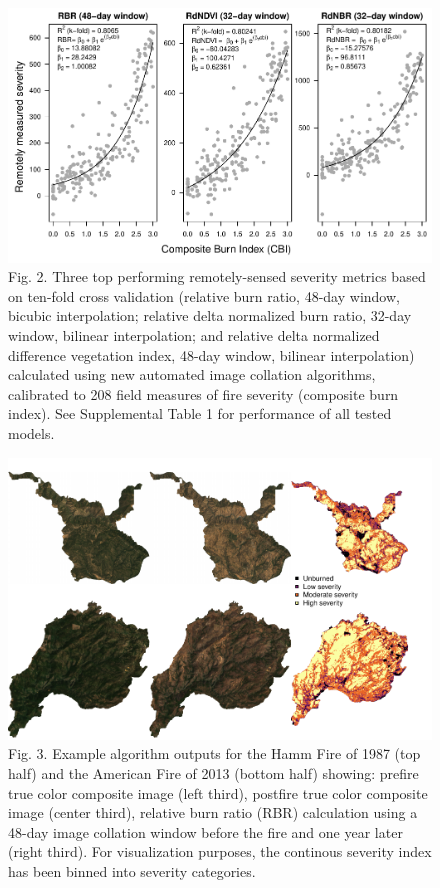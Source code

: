 \documentclass[]{article}
\begin{document}
\begin{figure}
\centering
\includegraphics{../../figures/remote-sensed-severity-calibration.pdf}
\caption{Fig. 2. Three top performing remotely-sensed severity metrics
based on ten-fold cross validation (relative burn ratio, 48-day window,
bicubic interpolation; relative delta normalized burn ratio, 32-day
window, bilinear interpolation; and relative delta normalized difference
vegetation index, 48-day window, bilinear interpolation) calculated
using new automated image collation algorithms, calibrated to 208 field
measures of fire severity (composite burn index). See Supplemental Table
1 for performance of all tested models.}
\end{figure}

\begin{figure}
\centering
\includegraphics{../../figures/pre-post-rbr.pdf}
\caption{Fig. 3. Example algorithm outputs for the Hamm Fire of 1987
(top half) and the American Fire of 2013 (bottom half) showing: prefire
true color composite image (left third), postfire true color composite
image (center third), relative burn ratio (RBR) calculation using a
48-day image collation window before the fire and one year later (right
third). For visualization purposes, the continous severity index has
been binned into severity categories.}
\end{figure}
\end{document}
